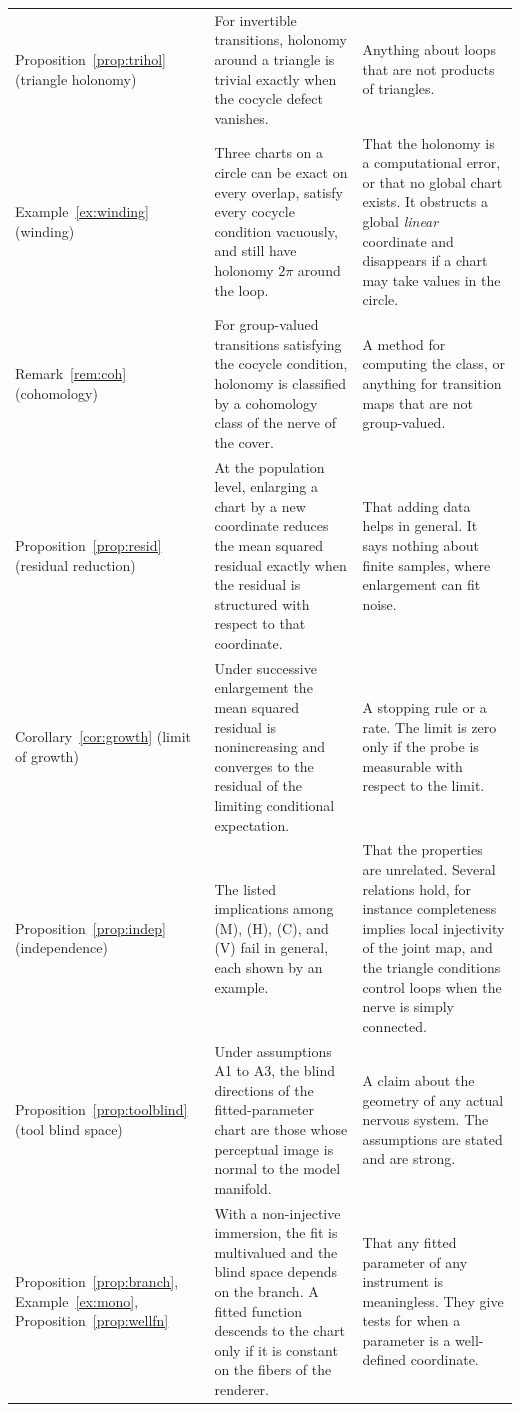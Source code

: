 \documentclass[11pt]{article}
\theoremstyle{remark}
\begin{document}
\begin{longtable}{@{}p{2.7cm}p{6.0cm}p{6.0cm}@{}}
Proposition~\ref{prop:trihol} (triangle holonomy) & For invertible transitions, holonomy around a triangle is trivial exactly when the cocycle defect vanishes. & Anything about loops that are not products of triangles.\\
Example~\ref{ex:winding} (winding) & Three charts on a circle can be exact on every overlap, satisfy every cocycle condition vacuously, and still have holonomy $2\pi$ around the loop. & That the holonomy is a computational error, or that no global chart exists. It obstructs a global \emph{linear} coordinate and disappears if a chart may take values in the circle.\\
Remark~\ref{rem:coh} (cohomology) & For group-valued transitions satisfying the cocycle condition, holonomy is classified by a cohomology class of the nerve of the cover. & A method for computing the class, or anything for transition maps that are not group-valued.\\
Proposition~\ref{prop:resid} (residual reduction) & At the population level, enlarging a chart by a new coordinate reduces the mean squared residual exactly when the residual is structured with respect to that coordinate. & That adding data helps in general. It says nothing about finite samples, where enlargement can fit noise.\\
Corollary~\ref{cor:growth} (limit of growth) & Under successive enlargement the mean squared residual is nonincreasing and converges to the residual of the limiting conditional expectation. & A stopping rule or a rate. The limit is zero only if the probe is measurable with respect to the limit.\\
Proposition~\ref{prop:indep} (independence) & The listed implications among (M), (H), (C), and (V) fail in general, each shown by an example. & That the properties are unrelated. Several relations hold, for instance completeness implies local injectivity of the joint map, and the triangle conditions control loops when the nerve is simply connected.\\
Proposition~\ref{prop:toolblind} (tool blind space) & Under assumptions A1 to A3, the blind directions of the fitted-parameter chart are those whose perceptual image is normal to the model manifold. & A claim about the geometry of any actual nervous system. The assumptions are stated and are strong.\\
Proposition~\ref{prop:branch}, Example~\ref{ex:mono}, Proposition~\ref{prop:wellfn} & With a non-injective immersion, the fit is multivalued and the blind space depends on the branch. A fitted function descends to the chart only if it is constant on the fibers of the renderer. & That any fitted parameter of any instrument is meaningless. They give tests for when a parameter is a well-defined coordinate.\\

\end{longtable}
\end{document}

